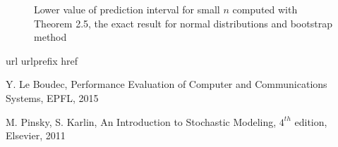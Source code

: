 \documentclass[10pt]{article}
\begin{document}
\begin{figure}[h!]
\centering
 	 \caption{Lower value of prediction interval for small $n$ computed with Theorem 2.5, the exact result for normal distributions and bootstrap method}
  \label{fig:pi_small_norm}
\end{figure}


\begin{thebibliography}{10}
\expandafter\ifx\csname url\endcsname\relax
  \def\url#1{\texttt{#1}}\fi
\expandafter\ifx\csname urlprefix\endcsname\relax\def\urlprefix{URL}\fi
\expandafter\ifx\csname href\endcsname\relax
  \def\href#1#2{#2} \def\path#1{#1}\fi


Y. Le Boudec, Performance Evaluation of Computer and Communications Systems, EPFL, 2015

M. Pinsky, S. Karlin, An Introduction to Stochastic Modeling, $4^{th}$ edition, Elsevier, 2011


\end{thebibliography}
\end{document}
